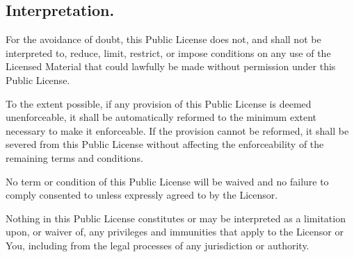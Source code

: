   \subsection{Interpretation.}
    \begin{myEnumerate}
      \item For the avoidance of doubt, this Public License does not, and shall not be interpreted to, reduce, limit,
      restrict, or impose conditions on any use of the Licensed Material that could lawfully be made without permission under
      this Public License.
      \item To the extent possible, if any provision of this Public License is deemed unenforceable, it shall be
      automatically reformed to the minimum extent necessary to make it enforceable. If the provision cannot be reformed, it
      shall be severed from this Public License without affecting the enforceability of the remaining terms and conditions.
      \item No term or condition of this Public License will be waived and no failure to comply consented to unless expressly
      agreed to by the Licensor.
      \item Nothing in this Public License constitutes or may be interpreted as a limitation upon, or waiver of, any
      privileges and immunities that apply to the Licensor or You, including from the legal processes of any jurisdiction or
      authority.
    \end{myEnumerate}
